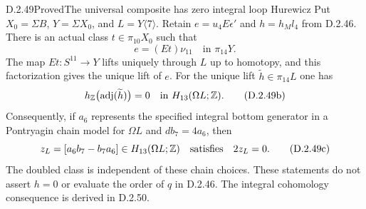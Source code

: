 \begin{claim}{D.2.49}{Proved}{The universal composite has zero integral loop Hurewicz}
Put $X_0=\Sigma B$, $Y=\Sigma X_0$, and $L=Y\langle7\rangle$.
Retain $e=u_4E\epsilon'$ and $h=h_Ml_4$ from D.2.46.
There is an actual class $t\in\pi_{10}X_0$ such that
\[
                    e=(Et)\nu_{11}\quad\text{in }\pi_{14}Y.
                    \tag{D.2.49a}
\]
The map $Et:S^{11}\to Y$ lifts uniquely through $L$ up to
homotopy, and this factorization gives the unique lift of $e$.
For the unique lift $\widetilde h\in\pi_{14}L$ one has
\[
 h_{\mathbb Z}\bigl(\operatorname{adj}(\widetilde h)\bigr)=0
                  \quad\text{in }H_{13}(\Omega L;\mathbb Z).
 \tag{D.2.49b}
\]
Consequently, if $a_6$ represents the specified integral bottom
generator in a Pontryagin chain model for $\Omega L$ and
$db_7=4a_6$, then
\[
 z_L=[a_6b_7-b_7a_6]\in H_{13}(\Omega L;\mathbb Z)
                         \quad\text{satisfies}\quad 2z_L=0.
 \tag{D.2.49c}
\]
The doubled class is independent of these chain choices.
These statements do not assert $h=0$ or evaluate the order of $q$
in D.2.46. The integral cohomology consequence is derived in D.2.50.
\end{claim}

